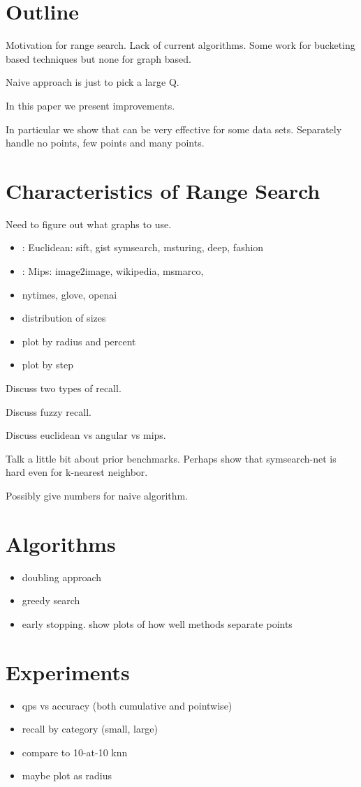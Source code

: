 \section{Outline}

Motivation for range search.   Lack of current algorithms.  Some work
for bucketing based techniques but none for graph based.

Naive approach is just to pick a large Q.

In this paper we present improvements.

In particular we show that can be very effective for some data sets.
Separately handle no points, few points and many points.

\section{Characteristics of Range Search}

Need to figure out what graphs to use.

\begin{itemize}
	\item: Euclidean: sift, gist symsearch, msturing, deep, fashion
	\item: Mips: image2image, wikipedia, msmarco,
	\item nytimes, glove, openai
\end{itemize}

\begin{itemize}
	\item distribution of sizes
	\item plot by radius and percent
	\item plot by step
\end{itemize}

Discuss two types of recall.

Discuss fuzzy recall.

Discuss euclidean vs angular vs mips.


Talk a little bit about prior benchmarks.
Perhaps show that symsearch-net is hard even for k-nearest neighbor.

Possibly give numbers for naive algorithm.

\section{Algorithms}

\begin{itemize}
	\item doubling approach
	\item greedy search
	\item early stopping.  show plots of how well methods separate points
\end{itemize}

\section{Experiments}

\begin{itemize}
	\item qps vs accuracy (both cumulative and pointwise)
	\item recall by category (small, large)
	\item compare to 10-at-10 knn
	\item maybe plot as radius
\end{itemize}